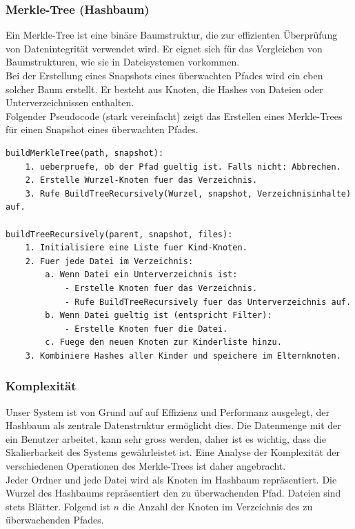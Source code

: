 \documentclass[a4paper,12pt]{report}
\begin{document}
    \clearpage

    \subsubsection{Merkle-Tree (Hashbaum)}
    Ein Merkle-Tree ist eine binäre Baumstruktur, die zur effizienten Überprüfung von Datenintegrität verwendet wird.
    Er eignet sich für das Vergleichen von Baumstrukturen, wie sie in Dateisystemen vorkommen.
    \\Bei der Erstellung eines Snapshots eines überwachten Pfades wird ein eben solcher Baum erstellt.
    Er besteht aus Knoten, die Hashes von Dateien oder Unterverzeichnissen enthalten.
    \\Folgender Pseudocode (stark vereinfacht) zeigt das Erstellen eines Merkle-Trees für einen Snapshot eines überwachten Pfades.

    \begin{lstlisting}[label={lst:merkle-pseudo}]
buildMerkleTree(path, snapshot):
    1. ueberpruefe, ob der Pfad gueltig ist. Falls nicht: Abbrechen.
    2. Erstelle Wurzel-Knoten fuer das Verzeichnis.
    3. Rufe BuildTreeRecursively(Wurzel, snapshot, Verzeichnisinhalte) auf.

buildTreeRecursively(parent, snapshot, files):
    1. Initialisiere eine Liste fuer Kind-Knoten.
    2. Fuer jede Datei im Verzeichnis:
        a. Wenn Datei ein Unterverzeichnis ist:
            - Erstelle Knoten fuer das Verzeichnis.
            - Rufe BuildTreeRecursively fuer das Unterverzeichnis auf.
        b. Wenn Datei gueltig ist (entspricht Filter):
            - Erstelle Knoten fuer die Datei.
        c. Fuege den neuen Knoten zur Kinderliste hinzu.
    3. Kombiniere Hashes aller Kinder und speichere im Elternknoten.

    \end{lstlisting}

    \subsubsection{\textbf{Komplexität}}
    Unser System ist von Grund auf auf Effizienz und Performanz ausgelegt, der Hashbaum als zentrale Datenstruktur ermöglicht dies.
    Die Datenmenge mit der ein Benutzer arbeitet, kann sehr gross werden, daher ist es wichtig, dass die Skalierbarkeit des Systems gewährleistet ist.
    Eine Analyse der Komplexität der verschiedenen Operationen des Merkle-Trees ist daher angebracht.
    \\
    Jeder Ordner und jede Datei wird als Knoten im Hashbaum repräsentiert.
    Die Wurzel des Hashbaums repräsentiert den zu überwachenden Pfad.
    Dateien sind stets Blätter.\newline
    Folgend ist $n$ die Anzahl der Knoten im Verzeichnis des zu überwachenden Pfades.
\end{document}
